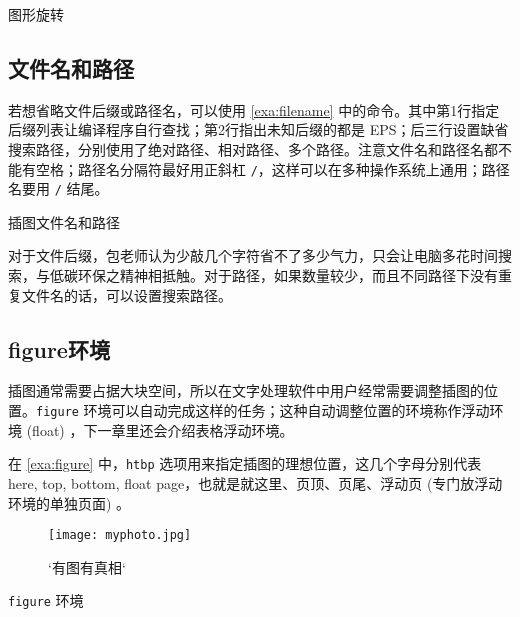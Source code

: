 \begin{example}[htbp]
\caption{图形旋转}
\label{exa:graph_rotate}
\end{example}

\subsection{文件名和路径}

若想省略文件后缀或路径名，可以使用 \autoref{exa:filename} 中的命令。其中第1行指定后缀列表让编译程序自行查找；第2行指出未知后缀的都是 EPS；后三行设置缺省搜索路径，分别使用了绝对路径、相对路径、多个路径。注意文件名和路径名都不能有空格；路径名分隔符最好用正斜杠 \verb|/|，这样可以在多种操作系统上通用；路径名要用 \verb|/| 结尾。

\begin{example}[h]
\begin{Code}[numbers=left]
\graphicspath{{c:/secret-garden/}}
\graphicspath{{./img/}}
\graphicspath{{one-little/}{two-little/}{three-little-indians/}}
\end{Code}
\caption{插图文件名和路径}
\label{exa:filename}
\end{example}

对于文件后缀，包老师认为少敲几个字符省不了多少气力，只会让电脑多花时间搜索，与低碳环保之精神相抵触。对于路径，如果数量较少，而且不同路径下没有重复文件名的话，可以设置搜索路径。

\subsection{figure环境}

插图通常需要占据大块空间，所以在文字处理软件中用户经常需要调整插图的位置。\texttt{figure} 环境可以自动完成这样的任务；这种自动调整位置的环境称作浮动环境 (float) ，下一章里还会介绍表格浮动环境。

在 \autoref{exa:figure} 中，\texttt{htbp} 选项用来指定插图的理想位置，这几个字母分别代表 here, top, bottom, float page，也就是就这里、页顶、页尾、浮动页 (专门放浮动环境的单独页面) 。

\begin{example}[h]
\begin{Code}[numbers=left]
\begin{figure}[htbp]
\centering
\texttt{[image: myphoto.jpg]}
\caption{`有图有真相`}
\label{fig:myphoto}
\end{figure}
\end{Code}
\caption{\texttt{figure} 环境}
\label{exa:figure}
\end{example}

